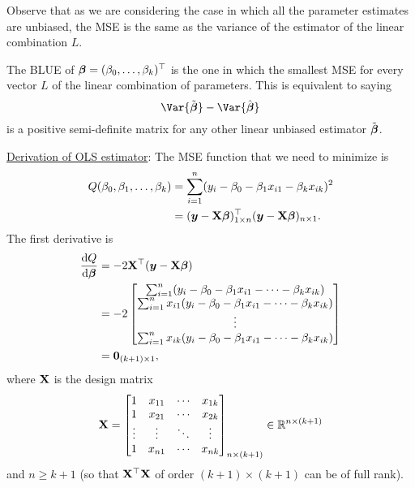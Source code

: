 Observe that as we are considering the case in which
all the parameter estimates are unbiased, the MSE is the same
as the variance of the estimator of the linear combination
$ L $.

The BLUE of $ {\boldsymbol \beta}=(\beta_0,\ldots,\beta_k)^\top $
is the one in which the smallest MSE for every vector $ L $
of the linear combination of parameters. This is equivalent to saying
\[ \Var{\tilde{\Vector{\beta}}}-\Var{\hat{\Vector{\beta}}} \]
is a positive semi-definite matrix for any other linear unbiased estimator
$ \tilde{{\boldsymbol \beta}} $.

\underline{Derivation of OLS estimator}:
The MSE function that we need to minimize is
\begin{align*}
    Q(\beta_0,\beta_1,\ldots,\beta_k)
     & =\sum_{i=1}^{n}(y_i-\beta_0-\beta_1x_{i1}-\beta_k x_{ik})^2                                               \\
     & =({\boldsymbol y}-\mathbf{X}{\boldsymbol \beta})^\top_{1\times n}({\boldsymbol y}-\mathbf{X}{\boldsymbol \beta})_{n\times 1}.
\end{align*}
The first derivative is
\begin{align*}
    \odv{Q}{\Vector{\beta}}
     & =-2 \Matrix{X}^\top (\Vector{y}-\Matrix{X}\Vector{\beta})                 \\
     & =-2 \begin{bmatrix}
               \sum_{i=1}^{n}(y_i-\beta_0-\beta_1x_{i1}-\cdots-\beta_k x_{ik})       \\
               \sum_{i=1}^{n}x_{i1}(y_i-\beta_0-\beta_1x_{i1}-\cdots-\beta_k x_{ik}) \\
               \vdots                                                                \\
               \sum_{i=1}^{n}x_{ik}(y_i-\beta_0-\beta_1x_{i1}-\cdots-\beta_k x_{ik})
           \end{bmatrix} \\
     & =\Vector{0}_{(k+1)\times 1},
\end{align*}
where $ \mathbf{X} $ is the design matrix
\[ \mathbf{X}=\begin{bmatrix}
        1      & x_{11} & \cdots & x_{1k} \\
        1      & x_{21} & \cdots & x_{2k} \\
        \vdots & \vdots & \ddots & \vdots \\
        1      & x_{n1} & \cdots & x_{nk}
    \end{bmatrix}_{n\times(k+1)}\in\mathbb{R}^{n\times(k+1)} \]
and $ n\ge k+1 $ (so that $ \mathbf{X}^\top \mathbf{X} $ of
order $ (k+1)\times(k+1) $ can be of full rank).

